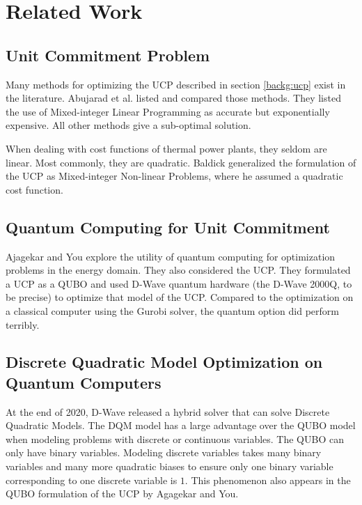 \section{Related Work}

\subsection{Unit Commitment Problem}

Many methods for optimizing the UCP described in section \ref{backg:ucp} exist in the literature.
Abujarad et al. \cite{Abujarad2017} listed and compared those methods.
They listed the use of Mixed-integer Linear Programming as accurate but exponentially expensive.
All other methods give a sub-optimal solution.
\cite{Abujarad2017}

When dealing with cost functions of thermal power plants, they seldom are linear.
Most commonly, they are quadratic.
Baldick \cite{Baldick1995} generalized the formulation of the UCP as Mixed-integer Non-linear Problems, where he assumed a quadratic cost function.

\subsection{Quantum Computing for Unit Commitment}

Ajagekar and You \cite{Ajagekar2019} explore the utility of quantum computing for optimization problems in the energy domain.
They also considered the UCP.
They formulated a UCP as a QUBO and used D-Wave quantum hardware (the D-Wave 2000Q, to be precise) to optimize that model of the UCP.
Compared to the optimization on a classical computer using the Gurobi solver, the quantum option did perform terribly.
\cite{Ajagekar2019}

\subsection{Discrete Quadratic Model Optimization on Quantum Computers}

At the end of 2020, D-Wave released a hybrid solver that can solve Discrete Quadratic Models.
\cite{DQMHybrid2020}
The DQM model has a large advantage over the QUBO model when modeling problems with discrete or continuous variables.
The QUBO can only have binary variables.
Modeling discrete variables takes many binary variables and many more quadratic biases to ensure only one binary variable corresponding to one discrete variable is $1$.
This phenomenon also appears in the QUBO formulation of the UCP by Agagekar and You.
\cite{Ajagekar2019}
